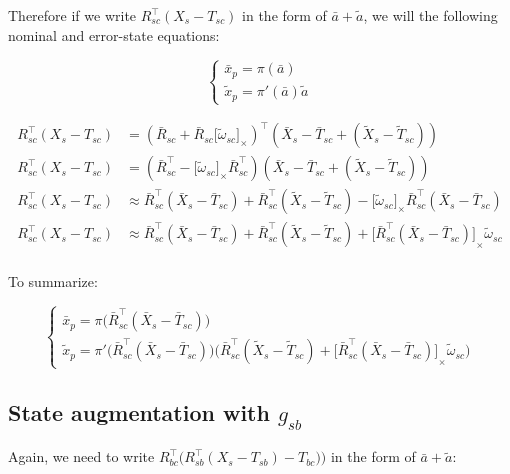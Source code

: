 \documentclass[letter,10pt]{article}
\newcommand{\asym}[1]{{\lbrack #1\rbrack}_\times{}}
\begin{document}
Therefore if we write $R_{sc}^\top(X_s-T_{sc})$ in the form of $\bar a+\tilde a$, we will the following nominal and error-state equations:

\begin{equation}
\begin{cases}
\bar x_p = \pi(\bar a)\\
\tilde x_p = \pi'(\bar a) \tilde a
\end{cases}
\end{equation}

\begin{equation}
\begin{aligned}
R_{sc}^\top(X_s-T_{sc}) 
&= (\bar R_{sc} + \bar R_{sc}\asym{\tilde \omega_{sc}})^\top (\bar X_s - \bar T_{sc} + (\tilde X_s - \tilde T_{sc})) \\
R_{sc}^\top(X_s-T_{sc}) 
&= (\bar R_{sc}^\top - \asym{\tilde \omega_{sc}}\bar R_{sc}^\top) (\bar X_s - \bar T_{sc} + (\tilde X_s - \tilde T_{sc})) \\
R_{sc}^\top(X_s-T_{sc}) 
&\approx \bar R_{sc}^\top(\bar X_s - \bar T_{sc}) 
+ \bar R_{sc}^\top(\tilde X_s - \tilde T_{sc})
- \asym{\tilde \omega_{sc}} \bar R_{sc}^\top(\bar X_s - \bar T_{sc})\\
R_{sc}^\top(X_s-T_{sc}) 
&\approx \bar R_{sc}^\top(\bar X_s - \bar T_{sc}) 
+ \bar R_{sc}^\top(\tilde X_s - \tilde T_{sc})
+ \asym{\bar R_{sc}^\top(\bar X_s - \bar T_{sc})} \tilde\omega_{sc}\\
\end{aligned}
\end{equation}

To summarize:

\begin{equation}
\begin{cases}
\bar x_p=\pi\big( \bar R_{sc}^\top (\bar X_s - \bar T_{sc})\big)\\
\tilde x_p=\pi'\big(\bar R_{sc}^\top(\bar X_s - \bar T_{sc})\big) 
\big( \bar R_{sc}^\top(\tilde X_s - \tilde T_{sc}) + \asym{\bar R_{sc}^\top(\bar X_s - \bar T_{sc})} \tilde \omega_{sc}\big)
\end{cases}
\end{equation}

\subsection{State augmentation with $g_{sb}$}
\label{sect-msckf-gsb}
Again, we need to write $R_{bc}^\top\big(R_{sb}^\top(X_s-T_{sb})-T_{bc})\big)$ in the form of $\bar a + \tilde a$:
\end{document}
